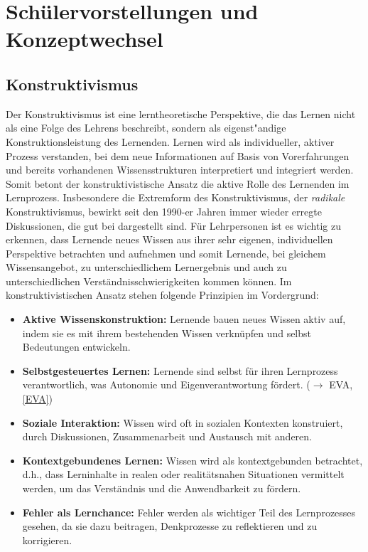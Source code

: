 \chapter{Sch{\"u}lervorstellungen und Konzeptwechsel}\label{Schuelervorstellungen}


\section{Konstruktivismus}\label{Konstruktivismus}

Der Konstruktivismus ist eine lerntheoretische Perspektive, die das Lernen nicht als eine Folge des Lehrens beschreibt, sondern als eigenst"{a}ndige Konstruktionsleistung des Lernenden. Lernen wird als individueller, aktiver Prozess verstanden, bei dem neue Informationen auf Basis von Vorerfahrungen und bereits vorhandenen Wissensstrukturen interpretiert und integriert werden. Somit betont der konstruktivistische Ansatz  die aktive Rolle des Lernenden im Lernprozess. Insbesondere die Extremform des Konstruktivismus, der \emph{radikale} Konstruktivismus, bewirkt  seit den 1990-er Jahren immer wieder erregte Diskussionen, die gut bei \textcite{JankMeyer}dargestellt sind. F\"{u}r Lehrpersonen ist es wichtig zu erkennen, dass Lernende neues Wissen aus ihrer sehr eigenen, individuellen Perspektive betrachten und aufnehmen und somit Lernende, bei gleichem Wissensangebot, zu unterschiedlichem Lernergebnis und auch zu unterschiedlichen Verst\"{a}ndnisschwierigkeiten kommen k\"{o}nnen.
\bip
Im konstruktivistischen Ansatz stehen folgende Prinzipien im Vordergrund:

\begin{itemize}
\item \textbf{Aktive Wissenskonstruktion:} Lernende bauen neues Wissen aktiv auf, indem sie es mit ihrem bestehenden Wissen verkn\"{u}pfen und selbst Bedeutungen entwickeln.
\item \textbf{Selbstgesteuertes Lernen:} Lernende sind selbst f\"{u}r ihren Lernprozess verantwortlich, was Autonomie und Eigenverantwortung f\"{o}rdert. ($\to$ EVA, \cref{EVA})
\item \textbf{Soziale Interaktion:} Wissen wird oft in sozialen Kontexten konstruiert, durch Diskussionen, Zusammenarbeit und Austausch mit anderen.
\item \textbf{Kontextgebundenes Lernen:} Wissen wird als kontextgebunden betrachtet, d.h., dass Lerninhalte in realen oder realit\"{a}tsnahen Situationen vermittelt werden, um das Verst\"{a}ndnis und die Anwendbarkeit zu f\"{o}rdern.
\item \textbf{Fehler als Lernchance:} Fehler werden als wichtiger Teil des Lernprozesses gesehen, da sie dazu beitragen, Denkprozesse zu reflektieren und zu korrigieren.
\end{itemize}

